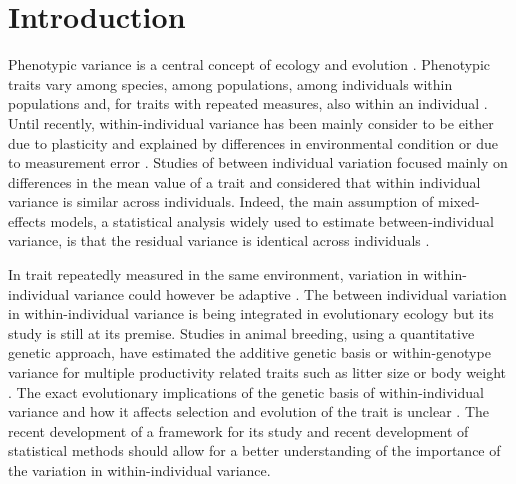 \documentclass[a4paper,12pt,twoside]{article}
\begin{document}
	\newpage
	\section*{Introduction}
	Phenotypic variance is a central concept of ecology and evolution \citep{roff_life_2002}.
	Phenotypic traits vary among species, among populations, among individuals within populations and, for traits with repeated measures, also within an individual \citep{roff_life_2002}. 
	Until recently, within-individual variance has been mainly consider to be either due to plasticity and explained by differences in environmental condition \citep{pigliucci_evolution_2005, nussey_evolutionary_2007} or due to measurement error \citep{pigliucci_evolution_2005, westneat_biology_2015}.
	Studies of between individual variation focused mainly on differences in the mean value of a trait and considered that within individual variance is similar across individuals.
	Indeed, the main assumption of mixed-effects models, a statistical analysis widely used to estimate between-individual variance, is that the residual variance is identical across individuals \citep{pinheiro_mixedeffects_2000,dingemanse_quantifying_2013}. 
	
	In trait repeatedly measured in the same environment, variation in within-individual variance could however be adaptive \citep{westneat_biology_2015,hill_genetic_2010}.
	The between individual variation in within-individual variance is being integrated in evolutionary ecology \citep{mulder_prediction_2007, nussey_evolutionary_2007} but its study is still at its premise.
	Studies in animal breeding, using a quantitative genetic approach, have estimated the additive genetic basis or within-genotype variance for multiple productivity related traits such as litter size or body weight \citep{hill_genetic_2010,sae-lim_genetic_2015}.
	The exact evolutionary implications of the genetic basis of within-individual variance and how it affects selection and evolution of the trait is unclear \citep[but see ][]{mulder_heritable_2015}.
	The recent development of a framework for its study \citep{westneat_biology_2015,hill_genetic_2010} and recent development of statistical methods \cite{cleasby_quantifying_2015,mulder_heritable_2015} should allow for a better understanding of the importance of the variation in within-individual variance.
	
\end{document}
